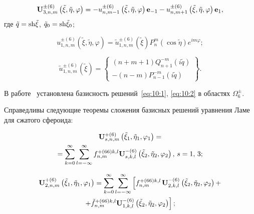 \begin{russian}
\begin{equation}
{\bf{U}}_{3,n,m}^{ \pm (6)}\left( {\tilde \xi ,\tilde \eta ,\varphi } \right) =  - u_{n,m - 1}^{ \pm (6)}\left( {\tilde \xi ,\tilde \eta ,\varphi } \right){{\bf{e}}_{ - 1}} - u_{n,m + 1}^{ \pm (6)}\left( {\tilde \xi ,\tilde \eta ,\varphi } \right){{\bf{e}}_1},
\end{equation}
где $\tilde q = {\mathop{\rm sh}\nolimits} \tilde \xi $, ${\tilde q_0} = {\mathop{\rm sh}\nolimits} {\tilde \xi _0}$;

\begin{equation}
u_{1,n,m}^{ \pm (6)}\left( {\tilde \xi ,\tilde \eta ,\varphi } \right) = \tilde u_{1,n,m}^{ \pm (6)}(\tilde \xi )P_n^m(\cos \tilde \eta ){e^{im\varphi }};
\end{equation}

\begin{equation}
\tilde u_{1,n,m}^{ \pm (6)}(\tilde \xi ) = \left\{ \begin{array}{l}
(n + m + 1)Q_{n + 1}^{ - m}(i\tilde q)\\
 - (n - m)P_{n - 1}^{ - m}(i\tilde q)
\end{array} \right\}.
\end{equation}

В работе~\cite{Nikolaev1998} установлена базисность решений~\eqref{eq:10:1}, \eqref{eq:10:2} в областях $\Omega_6^\pm$.

Справедливы следующие теоремы сложения базисных решений уравнения Ламе для сжатого сфероида:

\begin{multline}
{\bf{U}}_{s,n,m}^{ + (6)}\left( {{{\tilde \xi }_1},{{\tilde \eta }_1},{\varphi _1}} \right) = \\
= \sum\limits_{k = 0}^\infty  {\sum\limits_{l =  - \infty }^\infty  {f_{n,m}^{ + (66)k,l}} } {\bf{U}}_{s,k,l}^{ - (6)}\left( {{{\tilde \xi }_2},{{\tilde \eta }_2},{\varphi _2}} \right),\,s = 1,{\mkern 1mu} {\kern 1pt} 3;
\label{eq:10:4}
\end{multline}

\begin{multline}
{\bf{U}}_{2,n,m}^{ + (6)}\left( {{{\tilde \xi }_1},{{\tilde \eta }_1},{\varphi _1}} \right) = \sum\limits_{k = 0}^\infty  {\sum\limits_{l =  - \infty }^\infty  {\left[ {f_{n,m}^{ + (66)k,l}} \right.} } {\bf{U}}_{2,k,l}^{ - (6)}\left( {{{\tilde \xi }_2},{{\tilde \eta }_2},{\varphi _2}} \right) + \\
\left. { + \tilde f_{n,m}^{ + (66)k,l}{\bf{U}}_{1,k,l}^{ - (6)}\left( {{{\tilde \xi }_2},{{\tilde \eta }_2},{\varphi _2}} \right)} \right];
\label{eq:10:5}
\end{multline}


\end{russian}
